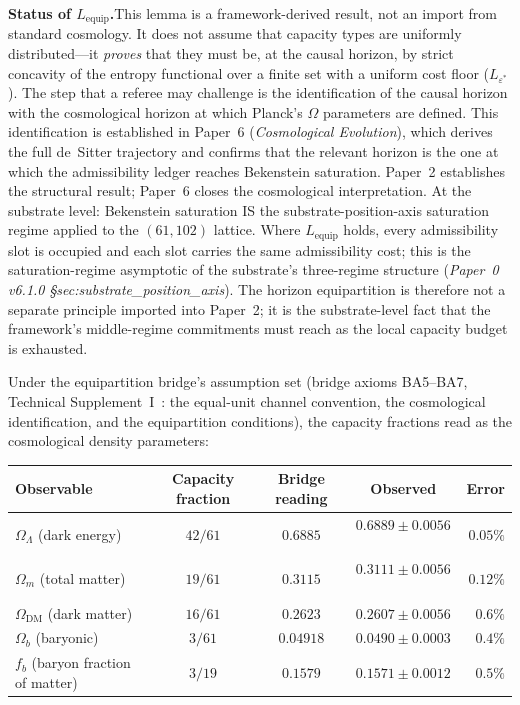 \documentclass[11pt]{article}
\begin{document}
\smallskip
\noindent\textbf{Status of $L_{\mathrm{equip}}$.}\quad This lemma is a framework-derived result, not an import from standard cosmology.  It does not assume that capacity types are uniformly distributed---it \emph{proves} that they must be, at the causal horizon, by strict concavity of the entropy functional over a finite set with a uniform cost floor ($L_{\varepsilon^*}$).  The step that a referee may challenge is the identification of the causal horizon with the cosmological horizon at which Planck's $\Omega$ parameters are defined.  This identification is established in Paper~6 (\emph{Cosmological Evolution}), which derives the full de~Sitter trajectory and confirms that the relevant horizon is the one at which the admissibility ledger reaches Bekenstein saturation.  Paper~2 establishes the structural result; Paper~6 closes the cosmological interpretation.  At the substrate level: Bekenstein saturation IS the substrate-position-axis saturation regime applied to the $(61, 102)$ lattice. Where $L_{\mathrm{equip}}$ holds, every admissibility slot is occupied and each slot carries the same admissibility cost; this is the saturation-regime asymptotic of the substrate's three-regime structure (\emph{Paper~0 v6.1.0 \S sec:substrate\_position\_axis}). The horizon equipartition is therefore not a separate principle imported into Paper~2; it is the substrate-level fact that the framework's middle-regime commitments must reach as the local capacity budget is exhausted.

Under the equipartition bridge's assumption set (bridge axioms
BA5--BA7, Technical Supplement~I~\cite{BrookeP2Supplement}: the
equal-unit channel convention, the cosmological identification, and
the equipartition conditions), the capacity fractions read as the
cosmological density parameters:

\begin{center}
\small
\begin{tabular}{lcccr}
\toprule
\textbf{Observable} & \textbf{Capacity fraction} & \textbf{Bridge reading} & \textbf{Observed} & \textbf{Error} \\
\midrule
$\Omega_\Lambda$ (dark energy) & $42/61$ & $0.6885$ & $0.6889 \pm 0.0056$~\cite{Planck2020} & $0.05\%$ \\
$\Omega_m$ (total matter) & $19/61$ & $0.3115$ & $0.3111 \pm 0.0056$~\cite{Planck2020} & $0.12\%$ \\
$\Omega_{\mathrm{DM}}$ (dark matter) & $16/61$ & $0.2623$ & $0.2607 \pm 0.0056$ & $0.6\%$ \\
$\Omega_b$ (baryonic) & $3/61$ & $0.04918$ & $0.0490 \pm 0.0003$ & $0.4\%$ \\
$f_b$ (baryon fraction of matter) & $3/19$ & $0.1579$ & $0.1571 \pm 0.0012$ & $0.5\%$ \\
\bottomrule
\end{tabular}
\end{center}
\end{document}
